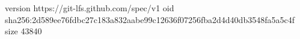 version https://git-lfs.github.com/spec/v1
oid sha256:2d589ee76fdbc27c183a832aabe99c12636f07256fba2d4d40db3548fa5a5c4f
size 43840
